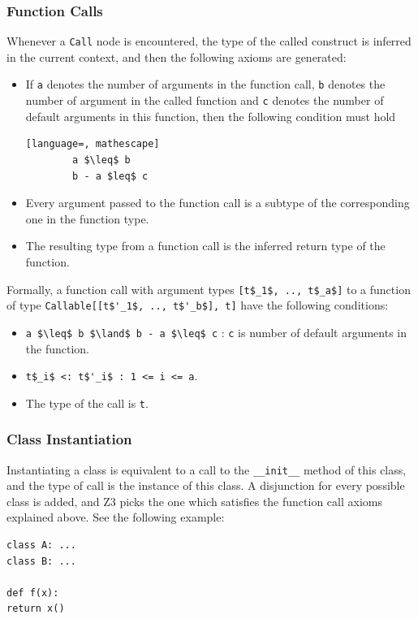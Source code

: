 \subsubsection{Function Calls}
Whenever a \lstinline|Call| node is encountered, the type of the called construct is inferred in the current context, and then the following axioms are generated:
\begin{itemize}
	\item If \lstinline|a| denotes the number of arguments in the function call, \lstinline|b| denotes the number of argument in the called function and \lstinline|c| denotes the number of default arguments in this function, then the following condition must hold
	\begin{lstlisting}[language=, mathescape]
		a $\leq$ b
		b - a $leq$ c
	\end{lstlisting}
	
	\item Every argument passed to the function call is a subtype of the corresponding one in the function type.
	
	\item The resulting type from a function call is the inferred return type of the function.
\end{itemize}

Formally, a function call with argument types \lstinline[mathescape]|[t$_1$, .., t$_a$]| to a function of type \lstinline[mathescape]|Callable[[t$'_1$, .., t$'_b$], t]| have the following conditions:
\begin{itemize}
	\item \lstinline[mathescape]|a $\leq$ b $\land$ b - a $\leq$ c| : \lstinline|c| is number of default arguments in the function.
	\item \lstinline[mathescape]|t$_i$ <: t$'_i$ : 1 <= i <= a|.
	\item The type of the call is \lstinline|t|.
\end{itemize}

\subsubsection{Class Instantiation}
Instantiating a class is equivalent to a call to the \lstinline|__init__| method of this class, and the type of call is the instance of this class. A disjunction for every possible class is added, and Z3 picks the one which satisfies the function call axioms explained above. See the following example:
\begin{lstlisting}
class A: ...
class B: ...

def f(x):
return x()
\end{lstlisting}

